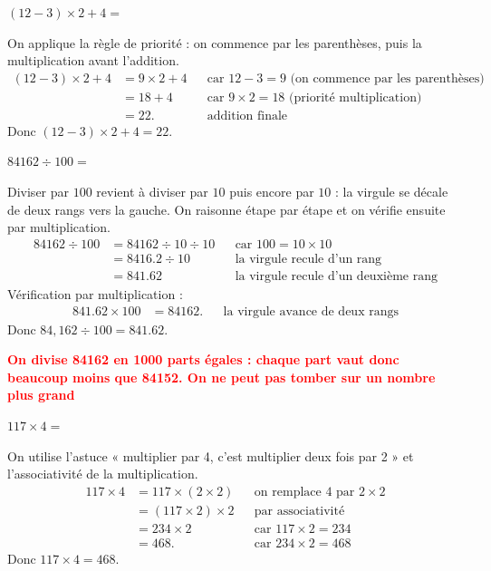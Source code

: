 \documentclass[answers]{exam}
\begin{document}
\begin{questions}
\question $(12 - 3) \times 2 + 4 =$
\begin{solution}
On applique la règle de priorité : on commence par les parenthèses, puis la multiplication avant l'addition.
\begin{align*}
(12 - 3) \times 2 + 4
&= 9 \times 2 + 4 &&\text{car }12 - 3 = 9 \text{ (on commence par les parenthèses)}  \\
&= 18 + 4 &&\text{car }9 \times 2 = 18 \text{ (priorité multiplication)} \\
&= 22. &&\text{addition finale}
\end{align*}
Donc $(12 - 3) \times 2 + 4 = 22$.
\end{solution}

\question $84162 \div 100 =$
\begin{solution}
Diviser par $100$ revient à diviser par $10$ puis encore par $10$ : la virgule se décale de deux rangs vers la gauche. On raisonne étape par étape et on vérifie ensuite par multiplication.
\begin{align*}
84162 \div 100
&= 84162 \div 10 \div 10 &&\text{car }100 = 10 \times 10 \\
&= 8416.2 \div 10 &&\text{la virgule recule d'un rang} \\
&= 841.62 &&\text{la virgule recule d'un deuxième rang}
\end{align*}
Vérification par multiplication : \
\begin{align*}
841.62 \times 100 &= 84162. &&\text{la virgule avance de deux rangs}
\end{align*}
Donc $84,162 \div 100 = 841.62$.

\textbf{\textcolor{red}{On divise 84162 en 1000 parts égales : chaque part vaut donc beaucoup moins que 84152. On ne peut pas tomber sur un nombre plus grand}} \\
\end{solution}

\question $117 \times 4 =$
\begin{solution}
On utilise l'astuce « multiplier par 4, c'est multiplier deux fois par 2 » et l'associativité de la multiplication.
\begin{align*}
117 \times 4
&= 117 \times (2 \times 2) &&\text{on remplace }4\text{ par }2\times2 \\
&= (117 \times 2) \times 2 &&\text{par associativité} \\
&= 234 \times 2 &&\text{car }117 \times 2 = 234 \\
&= 468. &&\text{car }234 \times 2 = 468
\end{align*}
Donc $117 \times 4 = 468$.
\end{solution}


\end{questions}
\end{document}
